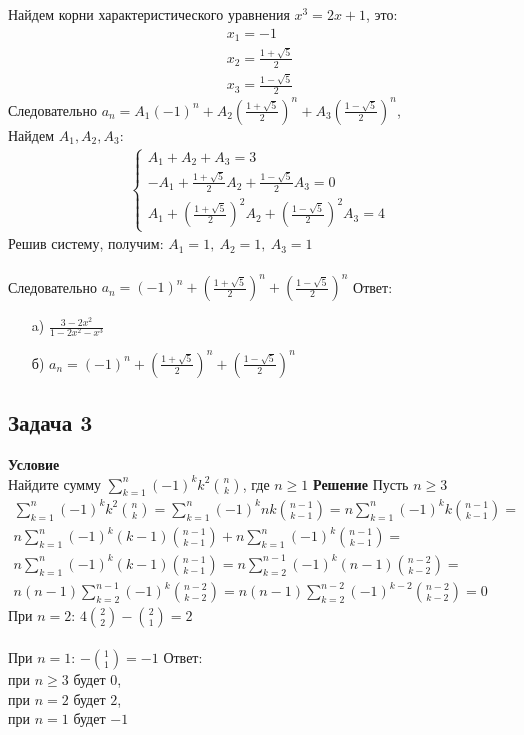 	Найдем корни характеристического уравнения $x^3 = 2x + 1$, это:
	\begin{gather*}
		x_1 = -1\\
		x_2 = \frac{1 + \sqrt{5}}{2}\\
		x_3 = \frac{1 - \sqrt{5}}{2}
	\end{gather*}
	Следовательно $a_n = A_1 (-1)^n + A_2 \left(\frac{1 + \sqrt{5}}{2}\right)^n + A_3 \left(\frac{1 - \sqrt{5}}{2}\right)^n$,\\
	Найдем $A_1, A_2, A_3$:
	\begin{gather*}
		\begin{cases}
			A_1 + A_2 + A_3 = 3\\
			-A_1 + \frac{1 + \sqrt{5}}{2} A_2 + \frac{1 - \sqrt{5}}{2} A_3 = 0\\
			A_1 + \left(\frac{1 + \sqrt{5}}{2}\right)^2 A_2 + \left(\frac{1 - \sqrt{5}}{2}\right)^2 A_3 = 4
		\end{cases}
	\end{gather*}
	Решив систему, получим: $A_1 = 1,\ A_2 = 1,\ A_3 = 1$\\
	\\
	Следовательно $a_n = (-1)^n + \left(\frac{1 + \sqrt{5}}{2}\right)^n + \left(\frac{1 - \sqrt{5}}{2}\right)^n$
	\vskip 0.1in
	\noindent
	Ответ:
	\begin{enumerate}
	\item[a)] $\frac{3 - 2x^2}{1 - 2x^2 - x^3}$
	\item[б)] $a_n = (-1)^n + \left(\frac{1 + \sqrt{5}}{2}\right)^n + \left(\frac{1 - \sqrt{5}}{2}\right)^n$
	\end{enumerate}
	
	
	\newpage
	\subsection*{Задача 3}
	\noindent
	\textbf{Условие}\\
	Найдите сумму $\sum\limits_{k=1}^{n}(-1)^{k} k^{2}{n \choose k}$, где $n \geqslant 1$
	\vskip 0.1in
	\noindent
	\textbf{Решение}
	Пусть $n \geqslant 3$
	\begin{gather*}
		\sum\limits^{n}_{k=1} (-1)^{k} k^2 {n \choose k} = 
		\sum\limits^{n}_{k=1} (-1)^{k} nk {{n-1} \choose {k-1}} = 
		n \sum\limits^{n}_{k=1} (-1)^{k} k{{n-1} \choose {k-1}} =\\ 
		n \sum\limits^{n}_{k=1} (-1)^{k} (k-1){{n-1} \choose {k-1}} + 
		n \sum\limits^{n}_{k=1} (-1)^{k} {{n-1} \choose {k-1}} =\\
		n \sum\limits^{n}_{k=1} (-1)^{k} (k-1){{n-1} \choose {k-1}} =
		n \sum\limits^{n-1}_{k=2} (-1)^{k} (n-1) {{n-2} \choose {k-2}} =\\
		n(n-1) \sum\limits^{n-1}_{k=2} (-1)^{k} {{n-2} \choose {k-2}} = 
		n(n-1) \sum\limits^{n-2}_{k=2} (-1)^{k-2} {{n-2} \choose {k-2}} = 
		0
	\end{gather*}
	При $n = 2$: $4{{2} \choose {2}} - {{2} \choose {1}} = 2$\\
	\\
	При $n = 1$: $-{{1} \choose {1}} = -1$
	\vskip 0.1in
	\noindent
	Ответ:\\ при $n \geqslant 3$ будет 0,\\ при $n = 2$ будет $2$,\\ при $n = 1$ будет $-1$
	
